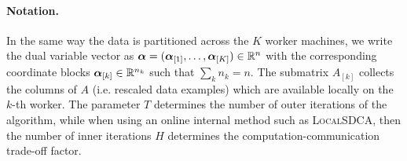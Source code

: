 \documentclass{article} %
\newcommand{\algname}{\textsc{CoCoA}\xspace}  %
\newcommand{\localSDCA}{\textsc{LocalSDCA}\xspace}
\begin{document}


\paragraph{Notation.} In the same way the data is partitioned across the $K$ worker machines, we write the dual variable vector as $\av = (\av_{[1]},\dots,\av_{[K]})%
\in \R^n$ with the corresponding coordinate blocks $\bm{\alpha}_{[k]}\in\mathbb{R}^{n_k}$ such that $\sum_k n_k = n$.
The submatrix $A_{[k]}$ collects the columns of $A$ (i.e. rescaled data examples) which are available locally on the $k$-th worker. 
The parameter $T$ determines the number of outer iterations of the algorithm, while when using an online internal method such as \localSDCA, then the number of inner iterations $H$ determines the computation-communication trade-off factor.
\end{document}
